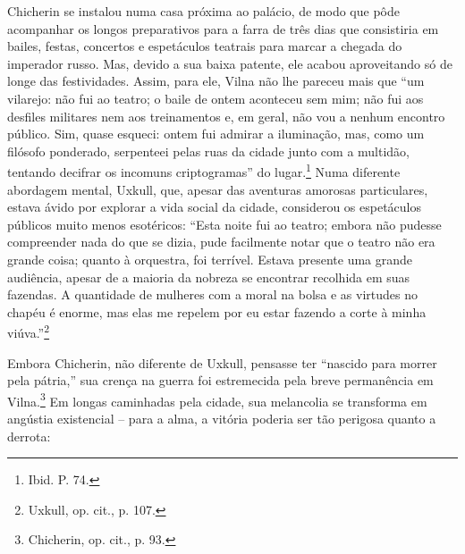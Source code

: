 Chicherin se instalou numa casa próxima ao palácio, de modo que pôde
acompanhar os longos preparativos para a farra de três dias que
consistiria em bailes, festas, concertos e espetáculos teatrais para
marcar a chegada do imperador russo. Mas, devido a sua baixa patente,
ele acabou aproveitando só de longe das festividades. Assim, para ele,
Vilna não lhe pareceu mais que ``um vilarejo: não fui ao teatro; o baile
de ontem aconteceu sem mim; não fui aos desfiles militares nem aos
treinamentos e, em geral, não vou a nenhum encontro público. Sim, quase
esqueci: ontem fui admirar a iluminação, mas, como um filósofo
ponderado, serpenteei pelas ruas da cidade junto com a multidão,
tentando decifrar os incomuns criptogramas'' do lugar.\footnote{Ibid. P. 74.} Numa diferente abordagem mental, Uxkull, que, apesar das aventuras amorosas particulares, estava ávido por explorar a vida social
da cidade, considerou os espetáculos públicos muito menos esotéricos:
``Esta noite fui ao teatro; embora não pudesse compreender nada do que
se dizia, pude facilmente notar que o teatro não era grande coisa;
quanto à orquestra, foi terrível. Estava presente uma grande audiência,
apesar de a maioria da nobreza se encontrar recolhida em suas fazendas.
A quantidade de mulheres com a moral na bolsa e as virtudes no chapéu é
enorme, mas elas me repelem por eu estar fazendo a corte à minha
viúva.''\footnote{Uxkull, op. cit., p. 107.}

Embora Chicherin, não diferente de Uxkull, pensasse ter ``nascido para
morrer pela pátria,'' sua crença na guerra foi estremecida pela breve
permanência em Vilna.\footnote{Chicherin, op. cit., p. 93.} Em longas
caminhadas pela cidade, sua melancolia se transforma em angústia
existencial -- para a alma, a vitória poderia ser tão perigosa quanto a
derrota:

